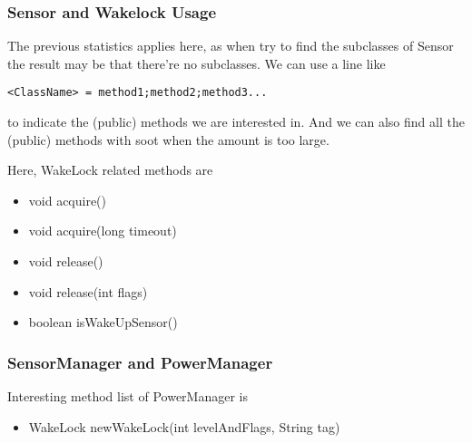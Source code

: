 \documentclass{article}
\begin{document}
\subsubsection{Sensor and Wakelock Usage}
The previous statistics applies here, as when 
try to find the subclasses of Sensor the result 
may be that there're no subclasses. 
We can use a line like
\begin{verbatim}
<ClassName> = method1;method2;method3...
\end{verbatim}
to indicate the (public) methods we are interested 
in. And we can also find all the (public) methods 
with soot when the amount is too large.
\par
{
	Here, WakeLock related methods are
	\begin{itemize}
		\item void acquire()
		\item void acquire(long timeout)
		\item void release()
		\item void release(int flags)
	\end{itemize}
}
\par
{
	\begin{itemize}
		\item boolean isWakeUpSensor()
	\end{itemize}
}

\subsubsection{SensorManager and PowerManager}
Interesting method list of PowerManager is
\begin{itemize}
	\item WakeLock newWakeLock(int levelAndFlags, String tag)
\end{itemize}
\end{document}
